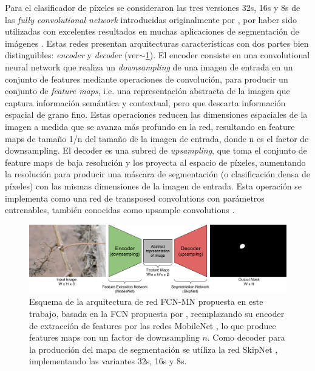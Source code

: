 \documentclass[a4paper,authoryear,review]{elsarticle}
\begin{document}
	Para el clasificador de píxeles se consideraron las tres versiones 32s, 16s y 8s de las \emph{fully convolutional network} introducidas originalmente por \citet{long2015fully}, por haber sido utilizadas con excelentes resultados en muchas aplicaciones de segmentación de imágenes \cite{litjens2017survey, garcia2018survey, kaymak2019brief}. Estas redes presentan arquitecturas características con dos partes bien distinguibles: \emph{encoder} y \emph{decoder} (ver$\sim$\ref{fig:FCN-MN}). 
	El encoder consiste en una convolutional neural network que realiza un \emph{downsampling} de una imagen de entrada en un conjunto de features mediante operaciones de convolución, para producir un conjunto de \emph{feature maps}, i.e. una representación abstracta de la imagen que captura información semántica y contextual, pero que descarta información espacial de grano fino. Estas operaciones reducen las dimensiones espaciales de la imagen a medida que se avanza más profundo en la red, resultando en feature maps de tamaño 1/n del tamaño de la imagen de entrada, donde n es el factor de downsampling. El decoder es una subred de \emph{upsampling}, que toma el conjunto de feature maps de baja resolución y los proyecta al espacio de píxeles, aumentando la resolución para producir una máscara de segmentación (o clasificación densa de píxeles) con las mismas dimensiones de la imagen de entrada. Esta operación se implementa como una red de transposed convolutions con parámetros entrenables, también conocidas como upsample convolutions \citet{shelhamer2017fully}. 
	
	
	
	\begin{figure}
		\centering
		\includegraphics[width=12cm]{figures/Figure1.png}
		\caption{Esquema de la arquitectura de red FCN-MN propuesta en este trabajo, basada en la FCN propuesta por \citet{shelhamer2017fully}, reemplazando su encoder de extracción de features por las redes MobileNet \cite{howard2017mobilenets}, lo que produce features maps con un factor de downsampling $n$. Como decoder para la producción  del mapa de segmentación se utiliza la red SkipNet \cite{siam2018rtseg}, implementando las variantes 32s, 16s y 8s.}
		\label{fig:FCN-MN}
	\end{figure}
	
\end{document}
